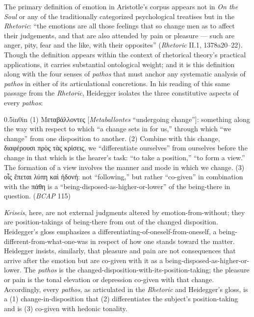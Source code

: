 \documentclass{article}
\newcommand{\gk}[1]{{\greekfont #1}}
\begin{document}
The primary definition of emotion in Aristotle's corpus appears not in \textit{On the Soul} or any of the traditionally categorized psychological treatises but in the \textit{Rhetoric}: ``the emotions are all those feelings that so change men as to affect their judgements, and that are also attended by pain or pleasure --- such are anger, pity, fear and the like, with their opposites'' (\textit{Rhetoric} II.1, 1378a20--22). Though the definition appears within the context of rhetorical theory's practical applications, it carries substantial ontological weight; and it is this definition along with the four senses of \textit{pathos} that must anchor any systematic analysis of \textit{pathos} in either of its articulational concretions. In his reading of this same passage from the \textit{Rhetoric}, Heidegger isolates the three constitutive aspects of every \textit{pathos}:
\begin{adjustwidth}{0.5in}{0in}
(1) \gk{Μεταβάλλοντες} [\textit{Metaballontes} ``undergoing change'']: something along the way with respect to which ``a change sets in for us,'' through which ``we change'' from one disposition to another. (2) Combine with this change, \gk{διαφέρουσι πρὸς τὰς κρίσεις}, we ``differentiate ourselves'' from ourselves before the change in that which is the hearer's task: ``to take a position,'' ``to form a view.'' The formation of a view involves the manner and mode in which we change. (3) \gk{οἷς ἕπεται λύπη καὶ ἡδονή}: not ``following,'' but rather ``co-given'' in combination with the \gk{πάθη} is a ``being-disposed-as-higher-or-lower'' of the being-there in question. (\textit{BCAP} 115)
\end{adjustwidth}
\textit{Kriseis}, here, are not external judgments altered by emotion-from-without; they are position-takings of being-there from out of the changed disposition. Heidegger's gloss emphasizes a differentiating-of-oneself-from-oneself, a being-different-from-what-one-was in respect of how one stands toward the matter. Heidegger insists, similarly, that pleasure and pain are not consequences that arrive after the emotion but are co-given with it as a being-disposed-as-higher-or-lower. The \textit{pathos} is the changed-disposition-with-its-position-taking; the pleasure or pain is the tonal elevation or depression co-given with that change. Accordingly, every \textit{pathos}, as articulated in the \textit{Rhetoric} and Heidegger's gloss, is a (1) change-in-disposition that (2) differentiates the subject's position-taking and is (3) co-given with hedonic tonality.
\end{document}

